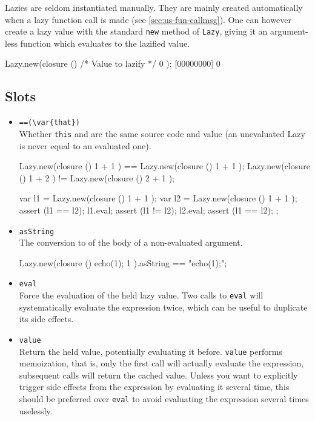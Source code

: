Lazies are seldom instantiated manually. They are mainly created
automatically when a lazy function call is made (see
\autoref{sec:us-fun-callmsg}). One can however create a lazy value with the
standard \lstinline|new| method of \lstinline|Lazy|, giving it an
argument-less function which evaluates to the lazified value.

\begin{urbiscript}
Lazy.new(closure () { /* Value to lazify */ 0 });
[00000000] 0
\end{urbiscript}

\subsection{Slots}

\begin{itemize}
\item \lstinline|==(\var{that})|\\
  Whether \lstinline|this| and  are the same source code and
  value (an unevaluated Lazy is never equal to an evaluated one).
\begin{urbiassert}
Lazy.new(closure () { 1 + 1 }) == Lazy.new(closure () { 1 + 1 });
Lazy.new(closure () { 1 + 2 }) != Lazy.new(closure () { 2 + 1 });
\end{urbiassert}
\begin{urbiscript}
{
  var l1 = Lazy.new(closure () { 1 + 1 });
  var l2 = Lazy.new(closure () { 1 + 1 });
  assert (l1 == l2);
  l1.eval;
  assert (l1 != l2);
  l2.eval;
  assert (l1 == l2);
};
\end{urbiscript}

\item \lstinline|asString|\\
  The conversion to  of the body of a non-evaluated
  argument.
\begin{urbiassert}
Lazy.new(closure () { echo(1); 1 }).asString == "echo(1);";
\end{urbiassert}

\item \lstinline|eval|\\
  Force the evaluation of the held lazy value. Two calls to
  \lstinline|eval| will systematically evaluate the expression twice,
  which can be useful to duplicate its side effects.

\item \lstinline|value|\\
  Return the held value, potentially evaluating it
  before. \lstinline|value| performs memoization, that is, only the
  first call will actually evaluate the expression, subsequent calls
  will return the cached value. Unless you want to explicitly trigger
  side effects from the expression by evaluating it several time, this
  should be preferred over \lstinline|eval| to avoid evaluating the
  expression several times uselessly.
\end{itemize}


